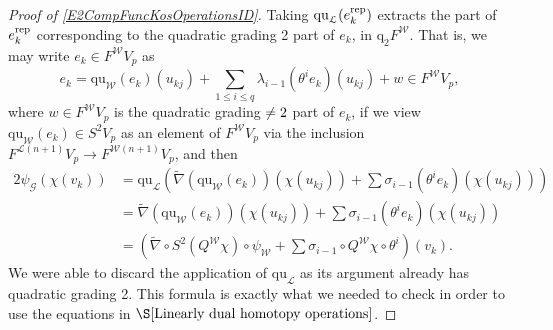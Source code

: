\documentclass[11pt]{amsart} \renewcommand{\baselinestretch}{1.4}
\theoremstyle{plain}
\theoremstyle{definition}
\renewcommand{\to}{\longrightarrow}
\newcommand{\scrG}{\mathscr{G}}
\newcommand{\calL}{\mathcal{L}}
\newcommand{\calw}{\mathcal{W}}
\newcommand{\call}{\mathcal{L}}
\newcommand{\BSW}{{\scrG}}
\newcommand{\quadratic}{\mathrm{qu}}
\newcommand{\quadgrad}[1]{\mathrm{q}_{#1}}
\begin{document}
\begin{Operations in composite functor spectral sequences}
\begin{proof}[Proof of \ref{E2CompFuncKosOperationsID}]
Taking $\quadratic_{\call}(e_{k}^\textup{rep})$ extracts the part of $e_{k}^\textup{rep}$ corresponding to the quadratic grading 2 part of $e_{k}$, in $\quadgrad{2}F^{\calw}$. That is, we may write $e_{k}\in F^{\calw}V_p$ as
\[e_{k}=\quadratic_{\calw}(e_k)(u_{kj})+\textstyle\sum_{1\leq i\leq q} \lambda_{i-1}(\theta^ie_k)(u_{kj}) + w\in F^{\calw}V_p,\]
where $w\in F^{\calw}V_p$ is the quadratic grading$\makebox[0cm][l]{}\neq2$ part of $e_{k}$, if we view $\quadratic_{\calw}(e_k)\in S^2V_p$ as an element of $F^{\calw}V_p$ via the inclusion $F^{\calL(n+1)}V_p\to F^{\calw(n+1)}V_p$, and then
\begin{alignat*}{2}
\psi_\BSW(\chi(v_k))&=\quadratic_{\calL} \left(\widetilde{\nabla}(\quadratic_{\calw}(e_k))(\chi(u_{kj}))+\sum \sigma_{i-1}(\theta^ie_k)(\chi(u_{kj}))\right)\\
&=\widetilde{\nabla}(\quadratic_{\calw}(e_k))(\chi(u_{kj}))+\sum \sigma_{i-1}(\theta^ie_k)(\chi(u_{kj}))\\
&=\left(\widetilde{\nabla}\circ S^2(Q^{\calw}\chi)\circ \psi_{\calw}+\sum\sigma_{i-1}\circ Q^{\calw}\chi\circ\theta^i\right)(v_k).
\end{alignat*}
We were able to discard the application of $\quadratic_{\calL}$ as its argument already has quadratic grading 2. This formula is exactly what we needed to check in order to use the equations in $\S\ref{Linearly dual homotopy operations}$.
\end{proof}


\end{Operations in composite functor spectral sequences}
\end{document}
